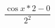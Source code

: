 \documentclass[14pt]{scrartcl}
\begin{document}
\begin{equation}
\frac{\cos{x}
*2-0}{2^2}
\end{equation}
\end{document}
